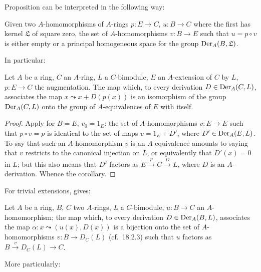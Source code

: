 Proposition  can be interpreted in the following way:

\begin{corollary}[20.1.3]
\label{0.20.1.3}
Given two $A$-homomorphisms of $A$-rings $p:E\to C$, $u:B\to C$ where the first has kernel $\mathfrak{L}$ of square zero, the set of $A$-homomorphisms $v:B\to E$ such that $u=p\circ v$ is either empty or a principal homogeneous space for the group $\operatorname{Der}_A(B,\mathfrak{L})$.
\end{corollary}

In particular:

\begin{corollary}[20.1.4]
\label{0.20.1.4}
Let $A$ be a ring, $C$ an $A$-ring, $L$ a $C$-bimodule, $E$ an $A$-extension of $C$ by $L$, $p:E\to C$ the augmentation.
The map which, to every derivation $D\in\operatorname{Der}_A(C,L)$, associates the map $x\leadsto x+D(p(x))$ is an isomorphism of the group $\operatorname{Der}_A(C,L)$ onto the group of $A$-equivalences of $E$ with itself.
\end{corollary}

\begin{proof}
Apply  for $B=E$, $v_0=1_E$: the set of $A$-homomorphisms $v:E\to E$ such that $p\circ v=p$ is identical to the set of maps $v=1_E+D'$, where $D'\in\operatorname{Der}_A(E,L)$.
To say that such an $A$-homomorphism $v$ is an $A$-equivalence amounts to saying that $v$ restricts to the canonical injection on $L$, or equivalently that $D'(x)=0$ in $L$; but this also means that $D'$ factors as $E\xrightarrow{p}C\xrightarrow{D}L$, where $D$ is an $A$-derivation.
Whence the corollary.
\end{proof}

For trivial extensions,  gives:

\begin{corollary}[20.1.5]
\label{0.20.1.5}
Let $A$ be a ring, $B$, $C$ two $A$-rings, $L$ a $C$-bimodule, $u:B\to C$ an $A$-homomorphism; the map which, to every derivation $D\in\operatorname{Der}_A(B,L)$, associates the map $\alpha:x\leadsto(u(x),D(x))$ is a bijection onto the set of $A$-homomorphisms $v:B\to D_C(L)$ \textup{(}cf.\ 18.2.3\textup{)} such that $u$ factors as $B\xrightarrow{v}D_C(L)\to C$.
\end{corollary}

More particularly:

